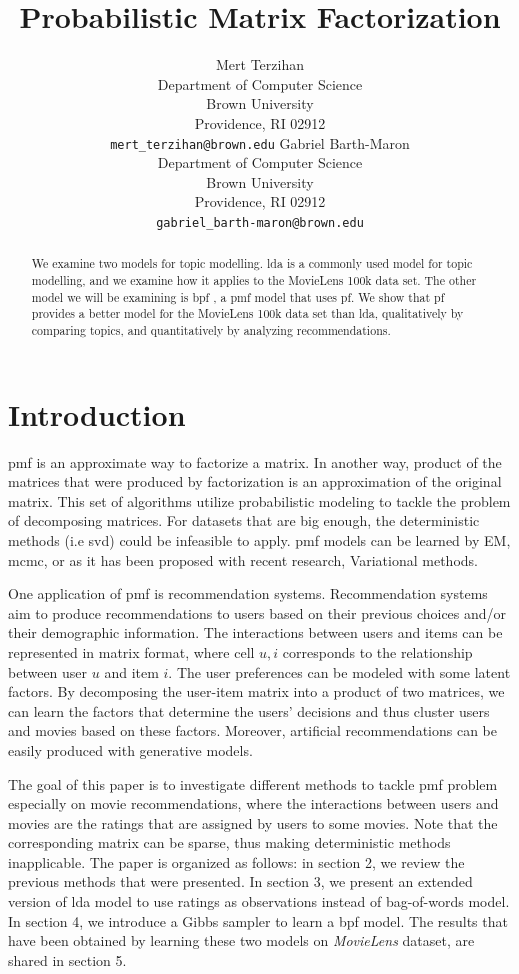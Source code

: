 \documentclass{article} %
\title{Probabilistic Matrix Factorization}
\author{ 
  Mert Terzihan \\
  Department of Computer Science\\
  Brown University\\
  Providence, RI 02912 \\
  \texttt{mert\_terzihan@brown.edu}
  \And
  Gabriel Barth-Maron \\
  Department of Computer Science \\
  Brown University \\
  Providence, RI 02912 \\
  \texttt{gabriel\_barth-maron@brown.edu}\\
}
\begin{document}
\maketitle
\begin{abstract}
We examine two models for topic modelling. \Gls{lda} is a commonly used model
for topic modelling, and we examine how it applies to the MovieLens 100k \cite{movielens100k} data set. The other model we will be examining is \Gls{bpf} \cite{gopalan2013scalable}, a \Gls{pmf} model that uses \Gls{pf}. We show that
\gls{pf} provides a better model for the MovieLens 100k data set than \gls{lda}, qualitatively by comparing topics, and quantitatively by analyzing recommendations.
\end{abstract}

\section{Introduction}
\Gls{pmf} is an approximate way to factorize a matrix. In another way, product 
of the matrices that were produced by factorization is an approximation of the 
original matrix. This set of algorithms utilize probabilistic modeling to tackle 
the problem of decomposing matrices. For datasets that are big enough, the 
deterministic methods (i.e \Gls{svd}) could be infeasible to apply. \Gls{pmf} 
models can be learned by EM, \Gls{mcmc}, or as it has been proposed with recent 
research, Variational methods. 

One application of \Gls{pmf} is recommendation systems. Recommendation systems 
aim to produce recommendations to users based on their previous choices and/or 
their demographic information. The interactions between users and items can be 
represented in matrix format, where cell $u,i$ corresponds to the relationship 
between user $u$ and item $i$. The user preferences can be modeled with some 
latent factors. By decomposing the user-item matrix into a product of two 
matrices, we can learn the factors that determine the users' decisions and thus 
cluster users and movies based on these factors. Moreover, artificial 
recommendations can be easily produced with generative models. 

The goal of this paper is to investigate different methods to tackle \Gls{pmf} 
problem especially on movie recommendations, where the interactions between 
users and movies are the ratings that are assigned by users to some movies. Note 
that the corresponding matrix can be sparse, thus making deterministic methods 
inapplicable. The paper is organized as follows: in section 2, we review the 
previous methods that were presented. In section 3, we present an extended 
version of \Gls{lda} model to use ratings as observations instead of bag-of-words 
model. In section 4, we introduce a Gibbs sampler to learn a \Gls{bpf} model. 
The results that have been obtained by learning these two models on 
\textit{MovieLens} dataset, are shared in section 5.
\end{document}
